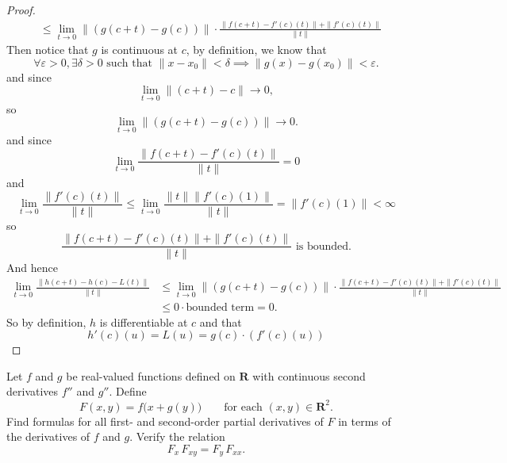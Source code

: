 \begin{proof}
\[\begin{aligned}
            &\le \lim_{t \to 0} \| (g(c+t)-g(c))  \| \cdot \frac{ \|f(c+t) - f'(c)(t) \| + \| f'(c)(t)\|}{\| t\|} 
        \end{aligned}
    \]
    Then notice that $g$ is continuous at $c$, by definition, we know that
    \[
         \forall \varepsilon >0, \exists \delta > 0 \text{ such that }\|x-x_0\| < \delta \implies \|g(x) - g(x_0)\| < \varepsilon.
    \]
    and since 
    \[
        \lim_{t \to 0} \| (c+t) - c \| \to 0,
    \]
    so 
    \[
        \lim_{t \to 0} \| (g(c+t)-g(c)) \| \to 0.
    \]
    and since 
    \[
        \lim_{t \to 0} \frac{ \|f(c+t) - f'(c)(t) \| }{\| t\|} = 0
    \]
    and
    \[
        \lim_{t \to 0} \frac{ \|f'(c)(t) \| }{\| t\|} \le \lim_{t \to 0} \frac{ \|t\|\|f'(c)(1) \| }{\| t\|} = \|f'(c)(1) \| <\infty
    \]
    so 
    \[
        \frac{ \|f(c+t) - f'(c)(t) \| + \| f'(c)(t)\|}{\| t\|} \text{ is bounded.}
    \]
    And hence
    \[
        \begin{aligned}
            \lim_{t \to 0} \frac{\| h(c+t) - h(c) -L(t)\|}{\| t\|} 
            &\le \lim_{t \to 0} \| (g(c+t)-g(c))  \| \cdot \frac{ \|f(c+t) - f'(c)(t) \| + \| f'(c)(t)\|}{\| t\|} \\
            &\le 0 \cdot \text{bounded term} = 0.
        \end{aligned}
    \]
    So by definition, $h$ is differentiable at $c$ and that 
    \[
        h'(c)(u) = L(u) = g(c)\cdot(f'(c)(u))
    \]
\end{proof}

\begin{problem}
    Let $f$ and $g$ be real-valued functions defined on $\mathbf{R}$ with continuous second
derivatives $f''$ and $g''$. Define
\[
F(x,y)=f\bigl(x+g(y)\bigr)
\qquad \text{for each }(x,y)\in \mathbf{R}^2.
\]
Find formulas for all first- and second-order partial derivatives of $F$ in terms of the
derivatives of $f$ and $g$. Verify the relation
\[
F_x\,F_{xy}=F_y\,F_{xx}.
\]
\end{problem}

